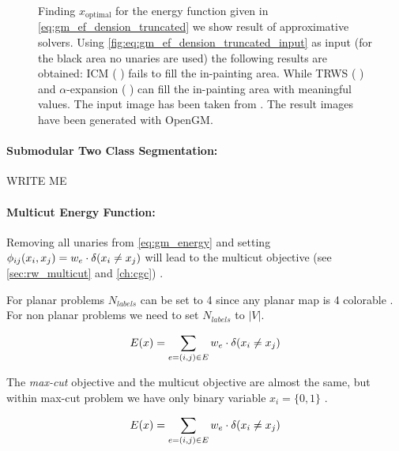 \begin{figure}[H]
{    }
    \caption[Energy based truncated denoising]{
        Finding $x_{\text{optimal}} $ for the energy function given
        in \cref{eq:gm_ef_dension_truncated} we show result of approximative solvers.
        Using \cref{fig:eq:gm_ef_dension_truncated_input} as input (for the black area no unaries 
        are used)
        the following
        results are obtained: ICM \citep{besag_1986_icm}  ( ) fails
        to fill the in-painting area. While TRWS \cite{kolmogorov_2006_pami_trws}  ( ) 
        and $\alpha$-expansion \cite{boykov_2001_pami}  ( ) can fill the in-painting area
        with meaningful values.
        The input image has been taken from \citep{szeliski_2008_pami}.
        The result images have been generated with OpenGM.
    }\label{fig:gm_ef_dension_truncated}
\end{figure}


\paragraph{Submodular Two Class Segmentation:}
    WRITE ME



\paragraph{Multicut Energy Function:}
Removing all unaries from \cref{eq:gm_energy} and 
setting $\phi_{ij}(x_i,x_j) =   w_e \cdot \delta( x_i \neq x_j )$ 
will lead to the multicut objective (see \cref{sec:rw_multicut} and \cref{ch:cgc}) .

For planar problems  $N_{labels}$ can be set to 4 since any planar map is 4 colorable \citep{appel_1977_4color}.
For non planar problems we need to set $N_{labels}$ to $|V|$.



\begin{align}
E(x)=
    \sum_{ e=(i,j) \in E}
        w_e \cdot \delta( x_i \neq x_j )
    \label{eq:gm_ef_multicut}
\end{align}


The \emph{max-cut} objective and  the multicut objective
are almost the same, 
but within max-cut problem we have only binary variable $x_i=\{0,1\}$ .

\begin{align}
E(x)=
    \sum_{ e=(i,j) \in E}
        w_e \cdot \delta( x_i \neq x_j )
    \label{eq:gm_ef_max_cut}
\end{align}




